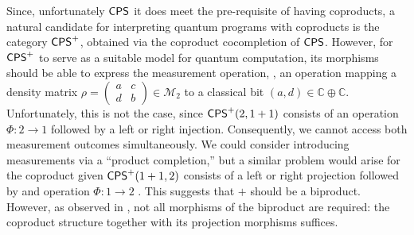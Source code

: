Since, unfortunately $\mathsf{CPS}$ it does meet the pre-requisite of having coproducts,
a natural candidate for interpreting quantum programs with coproducts is the category $\mathsf{CPS}^+$, obtained via the coproduct cocompletion of $\mathsf{CPS}$. However, for $\mathsf{CPS}^+$ to serve as a suitable model for quantum computation, its morphisms should be able to express the measurement operation, \ie, an operation mapping a density matrix $
\rho=\left(\begin{smallmatrix}
    a & c \\
    d & b
  \end{smallmatrix}\right)
  \in \mathcal{M}_2$ to a classical bit $(a,d) \in \mathbb{C} \oplus \mathbb{C}$. 
Unfortunately, this is not the case, since $\mathsf{CPS}^+(2, 1+1)$ consists of an operation $\Phi: 2 \to 1$ followed by a left or right injection. Consequently, we cannot access both measurement outcomes simultaneously. We could consider introducing measurements via a ``product completion,'' but a similar problem would arise for the coproduct given $\mathsf{CPS}^+(1+1, 2)$ consists of a left or right projection followed by and operation $\Phi: 1 \to 2$ . This suggests that \( + \) should be a biproduct. However, as observed in \cite{selinger2004towards}, not all morphisms of the biproduct are required: the coproduct structure together with its projection morphisms suffices. 

